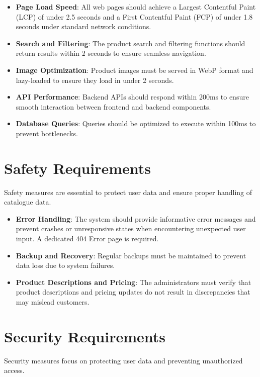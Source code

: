 \documentclass[oneside,a4paper,12pt,explicit]{book}
\begin{document}
\begin{itemize}
\item \textbf{Page Load Speed}: All web pages should achieve a Largest Contentful Paint (LCP) of under 2.5 seconds and a First Contentful Paint (FCP) of under 1.8 seconds under standard network conditions.
\item \textbf{Search and Filtering}: The product search and filtering functions should return results within 2 seconds to ensure seamless navigation.
\item \textbf{Image Optimization}: Product images must be served in WebP format and lazy-loaded to ensure they load in under 2 seconds.
\item \textbf{API Performance}: Backend APIs should respond within 200ms to ensure smooth interaction between frontend and backend components.
\item \textbf{Database Queries}: Queries should be optimized to execute within 100ms to prevent bottlenecks.
\end{itemize}

\section{Safety Requirements}
Safety measures are essential to protect user data and ensure proper handling of catalogue data.

\begin{itemize}
\item \textbf{Error Handling}: The system should provide informative error messages and prevent crashes or unresponsive states when encountering unexpected user input. A dedicated 404 Error page is required.
\item \textbf{Backup and Recovery}: Regular backups must be maintained to prevent data loss due to system failures.
\item \textbf{Product Descriptions and Pricing}: The administrators must verify that product descriptions and pricing updates do not result in discrepancies that may mislead customers.
\end{itemize}

\section{Security Requirements}
Security measures focus on protecting user data and preventing unauthorized access.
\end{document}
